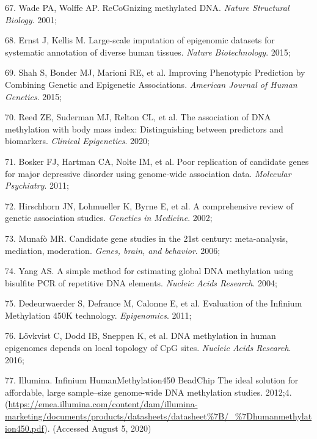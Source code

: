 \documentclass[11pt,oneside]{bristolthesis}
\newenvironment{cslreferences}%
  {}%
  {\par}
\begin{document}
\begin{cslreferences}
\leavevmode\hypertarget{ref-Wade2001}{}%
67. Wade PA, Wolffe AP. ReCoGnizing methylated DNA. \emph{Nature Structural Biology}. 2001;

\leavevmode\hypertarget{ref-Ernst2015}{}%
68. Ernst J, Kellis M. Large-scale imputation of epigenomic datasets for systematic annotation of diverse human tissues. \emph{Nature Biotechnology}. 2015;

\leavevmode\hypertarget{ref-Shah2015}{}%
69. Shah S, Bonder MJ, Marioni RE, et al. Improving Phenotypic Prediction by Combining Genetic and Epigenetic Associations. \emph{American Journal of Human Genetics}. 2015;

\leavevmode\hypertarget{ref-Reed2020}{}%
70. Reed ZE, Suderman MJ, Relton CL, et al. The association of DNA methylation with body mass index: Distinguishing between predictors and biomarkers. \emph{Clinical Epigenetics}. 2020;

\leavevmode\hypertarget{ref-Bosker2011}{}%
71. Bosker FJ, Hartman CA, Nolte IM, et al. Poor replication of candidate genes for major depressive disorder using genome-wide association data. \emph{Molecular Psychiatry}. 2011;

\leavevmode\hypertarget{ref-Hirschhorn2002}{}%
72. Hirschhorn JN, Lohmueller K, Byrne E, et al. A comprehensive review of genetic association studies. \emph{Genetics in Medicine}. 2002;

\leavevmode\hypertarget{ref-Munafo2006}{}%
73. Munafò MR. Candidate gene studies in the 21st century: meta-analysis, mediation, moderation. \emph{Genes, brain, and behavior}. 2006;

\leavevmode\hypertarget{ref-Yang2004}{}%
74. Yang AS. A simple method for estimating global DNA methylation using bisulfite PCR of repetitive DNA elements. \emph{Nucleic Acids Research}. 2004;

\leavevmode\hypertarget{ref-Dedeurwaerder2011}{}%
75. Dedeurwaerder S, Defrance M, Calonne E, et al. Evaluation of the Infinium Methylation 450K technology. \emph{Epigenomics}. 2011;

\leavevmode\hypertarget{ref-Lovkvist2016}{}%
76. Lövkvist C, Dodd IB, Sneppen K, et al. DNA methylation in human epigenomes depends on local topology of CpG sites. \emph{Nucleic Acids Research}. 2016;

\leavevmode\hypertarget{ref-Illumina2012}{}%
77. Illumina. Infinium HumanMethylation450 BeadChip The ideal solution for affordable, large sample--size genome-wide DNA methylation studies. 2012;4. (\url{https://emea.illumina.com/content/dam/illumina-marketing/documents/products/datasheets/datasheet\%7B/_\%7Dhumanmethylation450.pdf}). (Accessed August 5, 2020)


\end{cslreferences}
\end{document}
